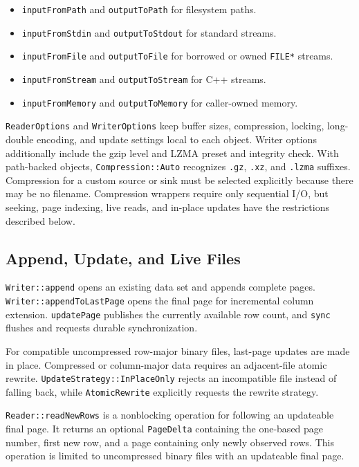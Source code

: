 \documentclass[11pt]{article}
\begin{document}
\begin{itemize}
\item {\tt inputFromPath} and {\tt outputToPath} for filesystem paths.
\item {\tt inputFromStdin} and {\tt outputToStdout} for standard streams.
\item {\tt inputFromFile} and {\tt outputToFile} for borrowed or owned
{\tt FILE*} streams.
\item {\tt inputFromStream} and {\tt outputToStream} for C++ streams.
\item {\tt inputFromMemory} and {\tt outputToMemory} for caller-owned memory.
\end{itemize}

{\tt ReaderOptions} and {\tt WriterOptions} keep buffer sizes, compression,
locking, long-double encoding, and update settings local to each object.  Writer
options additionally include the gzip level and LZMA preset and integrity
check.  With path-backed objects, {\tt Compression::Auto} recognizes
{\tt .gz}, {\tt .xz}, and {\tt .lzma} suffixes.  Compression for a custom
source or sink must be selected explicitly because there may be no filename.
Compression wrappers require only sequential I/O, but seeking, page indexing,
live reads, and in-place updates have the restrictions described below.

\subsection{Append, Update, and Live Files}

{\tt Writer::append} opens an existing data set and appends complete pages.
{\tt Writer::appendToLastPage} opens the final page for incremental column
extension.  {\tt updatePage} publishes the currently available row count, and
{\tt sync} flushes and requests durable synchronization.

For compatible uncompressed row-major binary files, last-page updates are made
in place.  Compressed or column-major data requires an adjacent-file atomic
rewrite.  {\tt UpdateStrategy::InPlaceOnly} rejects an incompatible file
instead of falling back, while {\tt AtomicRewrite} explicitly requests the
rewrite strategy.

{\tt Reader::readNewRows} is a nonblocking operation for following an
updateable final page.  It returns an optional {\tt PageDelta} containing the
one-based page number, first new row, and a page containing only newly observed
rows.  This operation is limited to uncompressed binary files with an
updateable final page.
\end{document}
